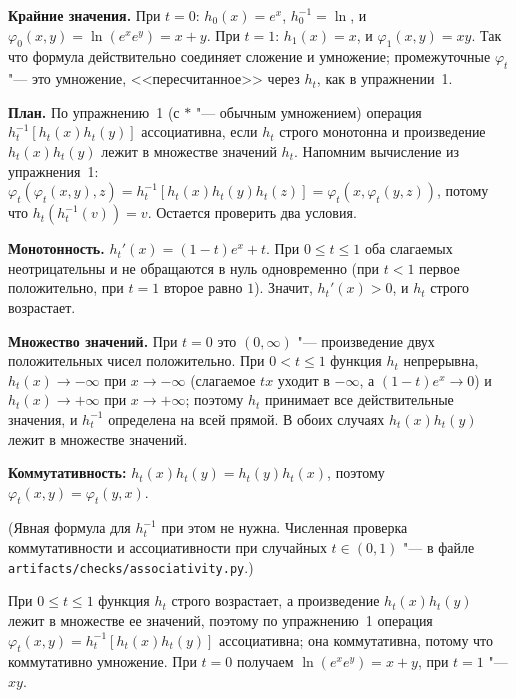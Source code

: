 \begin{solution}[3 (\S\,4)]
\textbf{Крайние значения.} При $t=0$: $h_0(x)=e^x$, $h_0^{-1}=\ln$, и
$\varphi_0(x,y)=\ln(e^xe^y)=x+y$. При $t=1$: $h_1(x)=x$, и
$\varphi_1(x,y)=xy$. Так что формула действительно соединяет сложение
и умножение; промежуточные $\varphi_t$ "--- это умножение, <<пересчитанное>>
через $h_t$, как в упражнении~1.

\textbf{План.} По упражнению~1 (с $*$ "--- обычным умножением) операция
$h_t^{-1}[h_t(x)h_t(y)]$ ассоциативна, если $h_t$ строго монотонна и
произведение $h_t(x)h_t(y)$ лежит в множестве значений $h_t$. Напомним
вычисление из упражнения~1:
$\varphi_t(\varphi_t(x,y),z)=h_t^{-1}[h_t(x)h_t(y)h_t(z)]=\varphi_t(x,\varphi_t(y,z))$,
потому что $h_t(h_t^{-1}(v))=v$. Остается проверить два условия.

\textbf{Монотонность.} $h_t'(x)=(1-t)e^x+t$. При $0\le t\le1$ оба слагаемых
неотрицательны и не обращаются в нуль одновременно (при $t<1$ первое
положительно, при $t=1$ второе равно $1$). Значит, $h_t'(x)>0$, и $h_t$
строго возрастает.

\textbf{Множество значений.} При $t=0$ это $(0,\infty)$ "--- произведение
двух положительных чисел положительно. При $0<t\le1$ функция $h_t$
непрерывна, $h_t(x)\to-\infty$ при $x\to-\infty$ (слагаемое $tx$ уходит
в $-\infty$, а $(1-t)e^x\to0$) и $h_t(x)\to+\infty$ при $x\to+\infty$;
поэтому $h_t$ принимает все действительные значения, и $h_t^{-1}$ определена
на всей прямой. В обоих случаях $h_t(x)h_t(y)$ лежит в множестве значений.

\textbf{Коммутативность:} $h_t(x)h_t(y)=h_t(y)h_t(x)$, поэтому
$\varphi_t(x,y)=\varphi_t(y,x)$.

(Явная формула для $h_t^{-1}$ при этом не нужна. Численная проверка
коммутативности и ассоциативности при случайных $t\in(0,1)$ "--- в файле
\texttt{artifacts/checks/associativity.py}.)

\answer При $0\le t\le1$ функция $h_t$ строго возрастает, а произведение
$h_t(x)h_t(y)$ лежит в множестве ее значений, поэтому по упражнению~1
операция $\varphi_t(x,y)=h_t^{-1}[h_t(x)h_t(y)]$ ассоциативна; она
коммутативна, потому что коммутативно умножение. При $t=0$ получаем
$\ln(e^xe^y)=x+y$, при $t=1$ "--- $xy$.
\end{solution}

